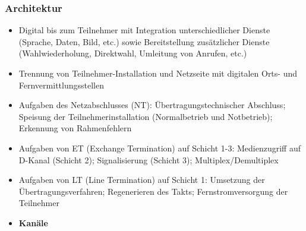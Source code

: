 \subsubsection{Architektur}
\begin{itemize}
	\item Digital bis zum Teilnehmer mit Integration unterschiedlicher Dienste (Sprache, Daten, Bild, etc.) sowie Bereitstellung zusätzlicher Dienste (Wahlwiederholung, Direktwahl, Umleitung von Anrufen, etc.)
	\item Trennung von Teilnehmer-Installation und Netzseite mit digitalen Orts- und Fernvermittlungsstellen
	\item Aufgaben des Netzabschlusses (NT): Übertragungstechnischer Abschluss; Speisung der Teilnehmerinstallation (Normalbetrieb und Notbetrieb); Erkennung von Rahmenfehlern
	\item Aufgaben von ET (Exchange Termination) auf Schicht 1-3: Medienzugriff auf D-Kanal (Schicht 2); Signalisierung (Schicht 3); Multiplex/Demultiplex
	\item Aufgaben von LT (Line Termination) auf Schicht 1: Umsetzung der Übertragungsverfahren; Regenerieren des Takts; Fernstromversorgung der Teilnehmer
	\item \textbf{Kanäle}
\end{itemize}

